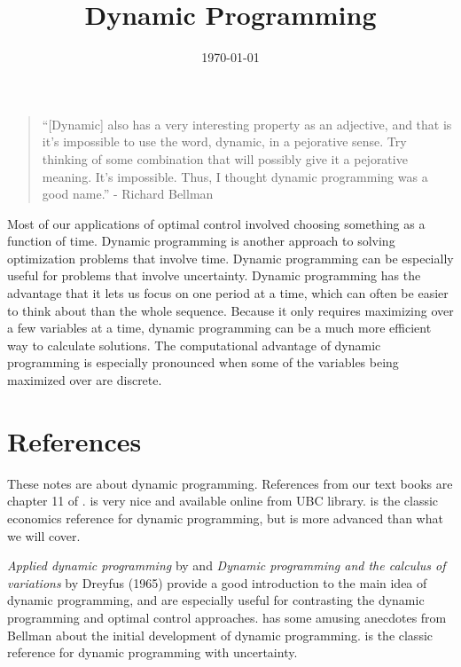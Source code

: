  

\title{Dynamic Programming}
\date{\today}



\maketitle

\begin{quotation}
  ``[Dynamic] also has a very interesting property as an adjective, and
  that is it’s impossible to use the word, dynamic, in a pejorative
  sense. Try thinking of some combination that will possibly give it a
  pejorative meaning.  It’s impossible. Thus, I thought dynamic
  programming was a good name.'' - Richard Bellman
\end{quotation}

Most of our applications of optimal control involved choosing
something as a function of time. Dynamic programming is another
approach to solving optimization problems that involve time. Dynamic
programming can be especially useful for problems that involve
uncertainty. Dynamic programming has the advantage
that it lets us focus on one period at a time, which can often be
easier to think about than the whole sequence. Because it only
requires maximizing over a few variables at a time, dynamic
programming can be a much more efficient way to calculate
solutions. The computational advantage of dynamic programming is
especially pronounced when some of the variables being maximized over
are discrete. 

\section{References}

These notes are about dynamic programming.  References from our text
books are chapter 11 of \cite{dixit1990}. \cite{adda2003} is very nice
and available online from UBC library.  \cite{stokey1989} is the
classic economics reference for dynamic programming, but is more
advanced than what we will cover. 

\textit{Applied dynamic programming} by \cite{bellman1962} and
\textit{Dynamic programming and the calculus of variations} by Dreyfus
(1965) provide a good introduction to the main idea of dynamic
programming, and are especially useful for contrasting the dynamic
programming and optimal control approaches.  \cite{dreyfus2002} has
some amusing anecdotes from Bellman about the initial development of
dynamic programming.  \cite{bertsekas1976} is
the classic reference for dynamic programming with uncertainty.

